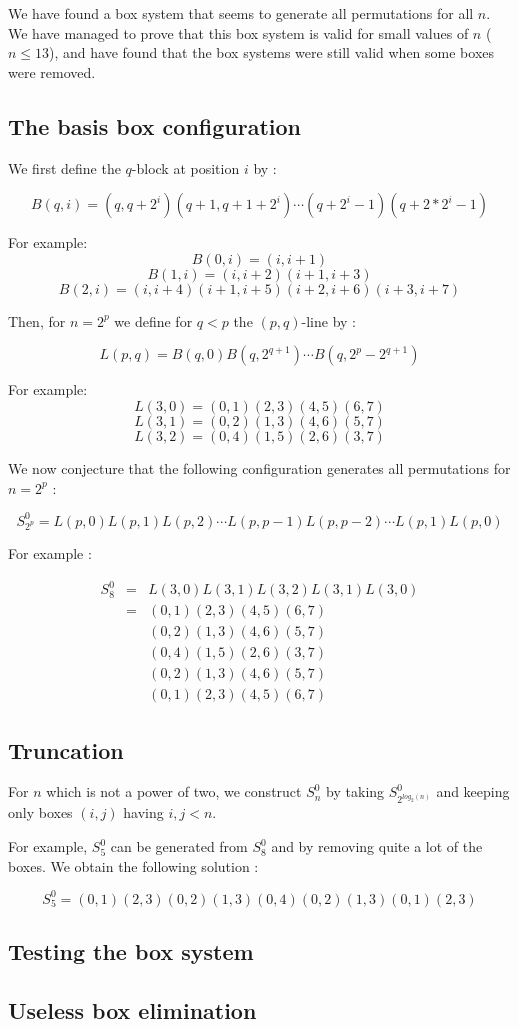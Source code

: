 \documentclass[11pt, a4paper]{article}
\begin{document}
We have found a box system that seems to generate all permutations for all $n$.
We have managed to prove that this box system is valid for small values of $n$
($n \leq 13$), and have found that the box systems were still valid when some
boxes were removed.

\subsection{The basis box configuration}

We first define the $q$-block at position $i$ by :

$$B(q,i) = (q,q+2^i)(q+1,q+1+2^i)\cdots(q+2^i-1)(q+2*2^i-1)$$

For example: 
$$B(0,i) = (i,i+1)$$
$$B(1,i) = (i, i+2)(i+1, i+3)$$
$$B(2, i) = (i,i+4)(i+1,i+5)(i+2,i+6)(i+3,i+7)$$

Then, for $n=2^p$ we define for $q < p$ the $(p,q)$-line by :

$$L(p,q) = B(q,0) B(q,2^{q+1}) \cdots B(q,2^p-2^{q+1})$$

For example:
$$L(3,0) = (0,1)(2,3)(4,5)(6,7)$$
$$L(3,1) = (0,2)(1,3)(4,6)(5,7)$$
$$L(3,2) = (0,4)(1,5)(2,6)(3,7)$$

We now conjecture that the following configuration generates all permutations
for $n=2^p$ :

$$S_{2^p}^0 = L(p,0) L(p,1) L(p,2) \cdots L(p,p-1) L(p,p-2) \cdots L(p,1) L(p,0)$$

For example :

$$
\begin{aligned}
	S_8^0 & = & L(3,0) L(3,1) L(3,2) L(3,1) L(3,0) \\
        & = & (0,1)(2,3)(4,5)(6,7) \\
		& & (0,2)(1,3)(4,6)(5,7) \\
		& & (0,4)(1,5)(2,6)(3,7) \\
		& & (0,2)(1,3)(4,6)(5,7) \\
        & & (0,1)(2,3)(4,5)(6,7)
\end{aligned}$$

\subsection{Truncation}

For $n$ which is not a power of two, we construct $S_n^0$ by taking
$S_{2^{log_2(n)}}^0$ and keeping only boxes $(i, j)$ having $i, j < n$.

For example, $S_5^0$ can be generated from $S_8^0$ and by removing quite a lot
of the boxes. We obtain the following solution :

$$S_5^0 = (0,1)(2,3)(0,2)(1,3)(0,4)(0,2)(1,3)(0,1)(2,3)$$

\subsection{Testing the box system}

\subsection{Useless box elimination}
\end{document}

